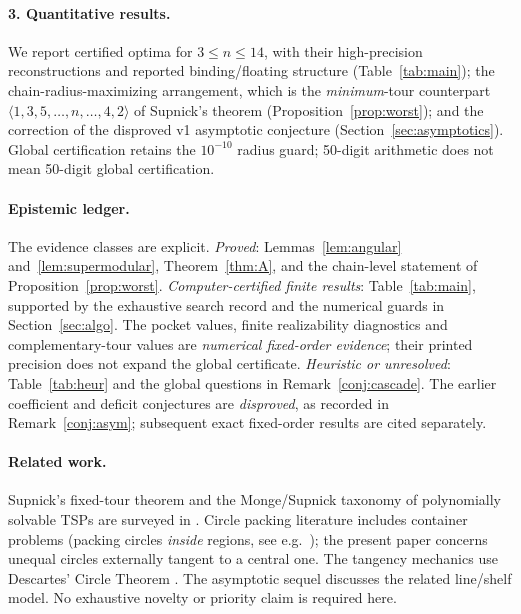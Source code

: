 \documentclass[11pt]{article}
\theoremstyle{definition}
\theoremstyle{remark}
\begin{document}
\paragraph{3. Quantitative results.}
We report certified optima for $3\le n\le14$, with their high-precision reconstructions and reported binding/floating structure (Table~\ref{tab:main}); the chain-radius-maximizing arrangement, which is the \emph{minimum}-tour counterpart $\langle 1,3,5,\dots,n,\dots,4,2\rangle$ of Supnick's theorem (Proposition~\ref{prop:worst}); and the correction of the disproved v1 asymptotic conjecture (Section~\ref{sec:asymptotics}). Global certification retains the $10^{-10}$ radius guard; 50-digit arithmetic does not mean 50-digit global certification.

\paragraph{Epistemic ledger.}
The evidence classes are explicit. \emph{Proved}: Lemmas~\ref{lem:angular} and~\ref{lem:supermodular}, Theorem~\ref{thm:A}, and the chain-level statement of Proposition~\ref{prop:worst}. \emph{Computer-certified finite results}: Table~\ref{tab:main}, supported by the exhaustive search record and the numerical guards in Section~\ref{sec:algo}. The pocket values, finite realizability diagnostics and complementary-tour values are \emph{numerical fixed-order evidence}; their printed precision does not expand the global certificate. \emph{Heuristic or unresolved}: Table~\ref{tab:heur} and the global questions in Remark~\ref{conj:cascade}. The earlier coefficient and deficit conjectures are \emph{disproved}, as recorded in Remark~\ref{conj:asym}; subsequent exact fixed-order results are cited separately.

\paragraph{Related work.}
Supnick's fixed-tour theorem \cite{supnick} and the Monge/Supnick taxonomy of polynomially solvable TSPs are surveyed in \cite{bdvvw}. Circle packing literature includes container problems (packing circles \emph{inside} regions, see e.g.\ \cite{hifi}); the present paper concerns unequal circles externally tangent to a central one. The tangency mechanics use Descartes' Circle Theorem \cite{mathews-zymaris-spinors}. The asymptotic sequel \cite{sequel} discusses the related line/shelf model. No exhaustive novelty or priority claim is required here.
\end{document}
